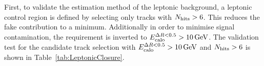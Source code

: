 First, to validate the estimation method of the leptonic background, a leptonic control region is defined by selecting only tracks with $\nhits>6$.
This reduces the fake contribution to a minimum.
Additionally in order to minimise signal contamination, the \ecalo requirement is inverted to $\ecalo>10\gev$.
The validation test for the candidate track selection with $\ecalo>10\gev$ and $\nhits>6$ is shown in Table~\ref{tab:LeptonicClosure}.
\renewcommand{\arraystretch}{1.4}
\begin{table}[!h]
\centering
\caption{Validation test of leptonic background estimation. Left: $\ecalo>10\gev$ and $\nhits>6$. Right: $\ecalo>10\gev$, $\nhits>6$ and $\ias>0.2$}
\label{tab:LeptonicClosure}
\end{table}


